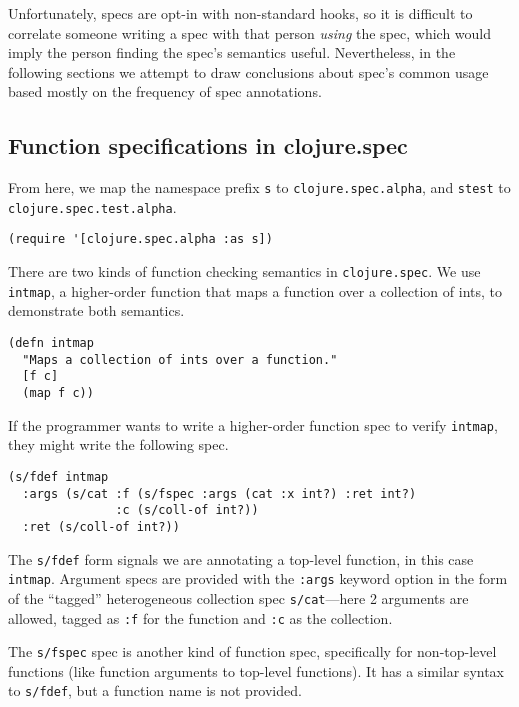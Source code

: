 Unfortunately, specs are opt-in with non-standard hooks, so it is difficult to
correlate someone writing a spec with that person \emph{using} the spec, which
would imply the person finding the spec's semantics useful.
Nevertheless, in the following sections we attempt to draw conclusions about
spec's common usage based mostly on the frequency of spec annotations.

\subsection{Function specifications in clojure.spec}

From here, we map the namespace prefix \texttt{s} to \texttt{clojure.spec.alpha},
and \texttt{stest} to \texttt{clojure.spec.test.alpha}.

\begin{verbatim}
(require '[clojure.spec.alpha :as s])
\end{verbatim}

There are two kinds of function checking semantics in \texttt{clojure.spec}.
We use \texttt{intmap}, a higher-order function that maps a function over 
a collection of ints, to demonstrate both semantics.

\begin{verbatim}
(defn intmap
  "Maps a collection of ints over a function."
  [f c]
  (map f c))
\end{verbatim}

If the programmer wants to write a higher-order function spec to
verify \texttt{intmap}, they might write the following spec.

\begin{verbatim}
(s/fdef intmap
  :args (s/cat :f (s/fspec :args (cat :x int?) :ret int?)
               :c (s/coll-of int?))
  :ret (s/coll-of int?))
\end{verbatim}

The \texttt{s/fdef} form signals we are annotating a top-level
function, in this case \texttt{intmap}. Argument specs are
provided with the \texttt{:args} keyword option
in the form of the ``tagged'' heterogeneous collection spec
\texttt{s/cat}---here 2 arguments are allowed, tagged as
\texttt{:f} for the function and \texttt{:c} as the collection.

The \texttt{s/fspec} spec is another kind of function spec,
specifically for non-top-level functions (like function arguments
to top-level functions). It has a similar syntax to \texttt{s/fdef},
but a function name is not provided.

